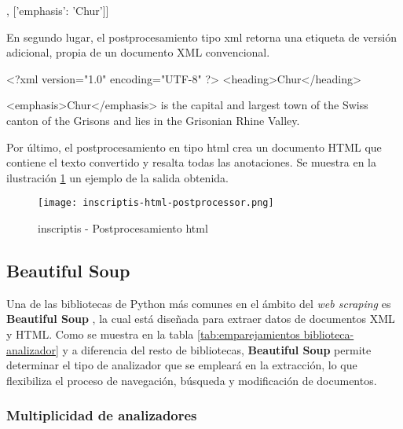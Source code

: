 \begin{Schunk}
  \begin{Soutput}
    [['heading', 'Chur'],
      ['emphasis': 'Chur']]
  \end{Soutput}
\end{Schunk}

En segundo lugar, el postprocesamiento tipo xml retorna una etiqueta de versión adicional, propia de un
documento XML convencional.

\begin{Schunk}
  \begin{Soutput}
    <?xml version="1.0" encoding="UTF-8" ?>
    <heading>Chur</heading>

    <emphasis>Chur</emphasis> is the capital and largest town of the 
    Swiss canton of the Grisons and lies in the Grisonian Rhine Valley.
  \end{Soutput}
\end{Schunk}

Por último, el postprocesamiento en tipo html crea un documento HTML que contiene el texto convertido y 
resalta todas las anotaciones. Se muestra en la ilustración \ref{img: inscriptis - postprocesamiento html} 
un ejemplo de la salida obtenida.

\begin{figure}[tphb]
  \centering
  \texttt{[image: inscriptis-html-postprocessor.png]}
  \caption{inscriptis - Postprocesamiento html}
  \label{img: inscriptis - postprocesamiento html}
\end{figure}

\subsection{Beautiful Soup}
\label{subsec:beautiful soup}

Una de las bibliotecas de Python más comunes en el ámbito del \emph{web scraping} es \textbf{Beautiful Soup}
\cite{beautifulsoup}, la cual está diseñada para extraer datos de documentos XML y HTML. Como se muestra
en la tabla \ref{tab:emparejamientos biblioteca-analizador} y a diferencia del resto de bibliotecas,
\textbf{Beautiful Soup} permite determinar el tipo de analizador que se empleará en la extracción, lo que
flexibiliza el proceso de navegación, búsqueda y modificación de documentos.

\subsubsection{Multiplicidad de analizadores}
\label{subsubsec:multiplicidad de analizadores}

